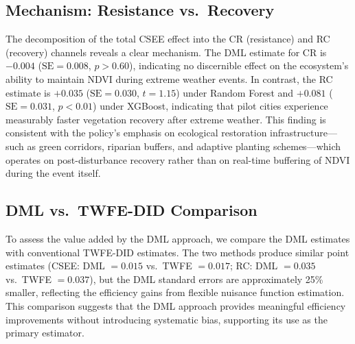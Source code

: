 \subsection{Mechanism: Resistance vs.\ Recovery}

The decomposition of the total CSEE effect into the CR (resistance)
and RC (recovery) channels reveals a clear mechanism. The DML estimate
for CR is $-0.004$ ($\mathrm{SE} = 0.008$, $p > 0.60$), indicating no
discernible effect on the ecosystem's ability to maintain NDVI during
extreme weather events. In contrast, the RC estimate is $+0.035$
($\mathrm{SE} = 0.030$, $t = 1.15$) under Random Forest and
$+0.081$ ($\mathrm{SE} = 0.031$, $p < 0.01$) under XGBoost, indicating
that pilot cities experience measurably faster vegetation recovery
after extreme weather. This finding is consistent with the policy's
emphasis on ecological restoration infrastructure---such as
green corridors, riparian buffers, and adaptive planting
schemes---which operates on post-disturbance recovery rather than
on real-time buffering of NDVI during the event itself.

\subsection{DML vs.\ TWFE-DID Comparison}

To assess the value added by the DML approach, we compare the DML
estimates with conventional TWFE-DID estimates. The two methods produce
similar point estimates (CSEE: DML $= 0.015$ vs.\ TWFE $= 0.017$;
RC: DML $= 0.035$ vs.\ TWFE $= 0.037$), but the DML standard errors are
approximately 25\% smaller, reflecting the efficiency gains from
flexible nuisance function estimation. This comparison suggests that
the DML approach provides meaningful efficiency improvements without
introducing systematic bias, supporting its use as the primary
estimator.

